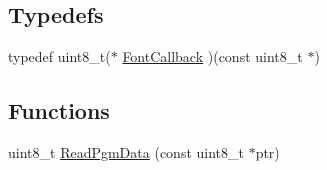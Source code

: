 \subsection*{Typedefs}
\begin{DoxyCompactItemize}
\item 
typedef uint8\_\-t($\ast$ \hyperlink{g_text-1_8h_ae36b3e52a6e5d20201ff5edf725c0fbd}{FontCallback} )(const uint8\_\-t $\ast$)
\end{DoxyCompactItemize}
\subsection*{Functions}
\begin{DoxyCompactItemize}
\item 
uint8\_\-t \hyperlink{g_text-1_8h_a64d487f987b8914d5eb283e3a56e13ca}{ReadPgmData} (const uint8\_\-t $\ast$ptr)
\end{DoxyCompactItemize}


